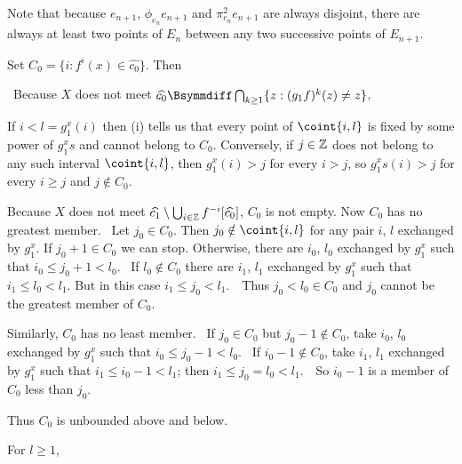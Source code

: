 {\def\Caption{Pairs of points exchanged by $g_1^x$}

\noindent Note that because $e_{n+1}$, $\phi_{e_n}e_{n+1}$ and
$\pi_{e_n}^2e_{n+1}$ are always disjoint, there are always at least two
points of $E_n$ between any two successive points of $E_{n+1}$.

\medskip

 Set $C_0=\{i:f^i(x)\in\widehat{c_0}\}$.   Then


\noindent\Prf\ Because $X$ does not meet
$\widehat{c_0}\Bsymmdiff\bigcap_{k\ge 1}\{z:(g_1f)^k(z)\ne z\}$,


\noindent If $i<l=g_1^x(i)$ then (i) tells us that every point of
$\coint{i,l}$ is fixed by some power of $g_1^xs$ and cannot belong to
$C_0$.   Conversely, if $j\in\Bbb Z$ does not belong to any such interval
$\coint{i,l}$, then $g_1^x(i)>j$ for every $i>j$, so $g_1^xs(i)>j$ for
every $i\ge j$ and $j\notin C_0$.\ \Qed

Because $X$ does not meet
$\widehat{c_1}\setminus\bigcup_{i\in\Bbb Z}f^{-i}[\widehat{c_0}]$,
$C_0$ is not empty.   Now $C_0$ has no greatest member.   \Prf\ Let
$j_0\in C_0$.   Then $j_0\notin\coint{i,l}$ for any pair $i$, $l$
exchanged by $g_1^x$.   If $j_0+1\in C_0$ we can stop.   Otherwise,
there are $i_0$, $l_0$ exchanged by $g_1^x$ such that
$i_0\le j_0+1<l_0$.   \Quer\ If
$l_0\notin C_0$ there are $i_1$, $l_1$ exchanged by $g_1^x$ such that
$i_1\le l_0<l_1$.   But in this case $i_1\le j_0<l_1$.\ \BanG\  Thus
$j_0<l_0\in C_0$ and $j_0$ cannot be the greatest member of $C_0$.\ \Qed

Similarly, $C_0$ has no least member.   \Prf\ If $j_0\in C_0$ but
$j_0-1\notin C_0$, take $i_0$, $l_0$ exchanged by $g_1^x$ such that
$i_0\le j_0-1<l_0$.   \Quer\ If $i_0-1\notin C_0$, take $i_1$, $l_1$
exchanged by $g_1^x$ such that $i_1\le i_0-1<l_1$;  then
$i_1\le j_0= l_0<l_1$.\ \BanG\  So $i_0-1$ is a member of $C_0$ less
than $j_0$.\ \Qed

Thus $C_0$ is unbounded above and below.

\medskip

 For $l\ge 1$,


}
